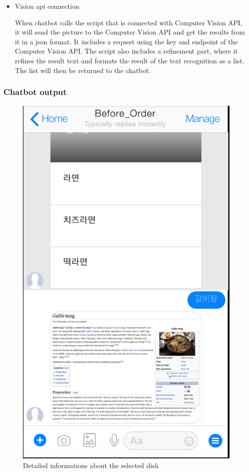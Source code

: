 \begin{itemize}
\item Vision api connection

When chatbot calls the script that is connected with Computer Vision API, it will send the picture to the Computer Vision API and get the results from it in a json format. It includes a request using the key and endpoint of the Computer Vision API. The script also includes a refinement part, where it refines the result text and formats the result of the text recognition as a list. The list will then be returned to the chatbot. \newline
\end{itemize}
\FloatBarrier

\subsubsection{Chatbot output}

\begin{figure}[htbp]
\centerline{\includegraphics[height=\custompicheight]{./pictures/facebook_dish_information}}
\caption{Detailed informations about the selected dish}
\label{fig:facebook_dish_information}
\end{figure}
\FloatBarrier

